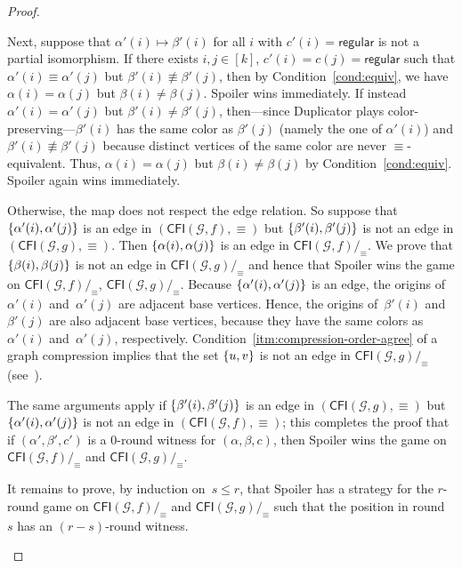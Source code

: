 \documentclass[10pt,a4paper]{article}
\DeclarePairedDelimiter\set{\lbrace}{\rbrace}
\newcommand{\regular}{\mathsf{regular}}
\newcommand{\comp}{\equiv}
\newcommand{\CFIsym}{\mathsf{CFI}}
\newcommand{\CFI}[1]{\CFIsym(#1)}
\newcommand{\compCFI}[2]{\CFI{#1}/_{#2}}
\newcommand{\precompCFI}[2]{{(\CFI{#1},#2)}}
\newcommand{\graphG}{\mathcal{G}}
\begin{document}
\begin{proof}
\begin{enumerate}
        Next, suppose that $\alpha'(i) \mapsto \beta'(i)$ for all $i$ with $c'(i) =\regular$
        is not a partial isomorphism. If there exists $i,j\in[k]$, $c'(i)=c(j)=\regular$ such that $\alpha'(i) \comp \alpha'(j)$ but $\beta'(i)\not\comp  \beta'(j)$, then
        by Condition~\ref{cond:equiv}, we have $\alpha(i)=\alpha(j)$ but $\beta(i)\neq \beta(j)$.
        Spoiler wins immediately.
        If instead $\alpha'(i) = \alpha'(j)$ but $\beta'(i) \neq \beta'(j)$,
        then---since Duplicator plays color-preserving---$\beta'(i)$ has the same color as $\beta'(j)$ (namely the one of $\alpha'(i)$)
        and $\beta'(i) \not\comp \beta'(j)$
        because distinct vertices of the same color are never $\comp$-\nobreakdash equivalent.
        Thus, $\alpha(i) = \alpha(j)$ but $\beta(i)\neq \beta(j)$ by Condition~\ref{cond:equiv}.
        Spoiler again wins immediately.
        
        Otherwise, the map does not respect the edge relation. So suppose that $\set{\alpha'(i),\alpha'(j)}$ is an edge in $\precompCFI{\graphG,f}{\comp}$
        but $\set{\beta'(i),\beta'(j)}$ is not an edge in $\precompCFI{\graphG,g}{\comp}$. Then $\set{\alpha(i),\alpha(j)}$ is an edge in $\compCFI{\graphG,f}{\comp}$.
        We prove that $\set{\beta(i),\beta(j)}$ is not an edge in $\compCFI{\graphG,g}{\comp}$ and hence that Spoiler wins the game on $\compCFI{\graphG,f}{\comp}$, $\compCFI{\graphG,g}{\comp}$.
        Because $\set{\alpha'(i),\alpha'(j)}$ is an edge,
        the origins of~$\alpha'(i)$ and~$\alpha'(j)$ are adjacent base vertices.
        Hence, the origins of~$\beta'(i)$ and~$\beta'(j)$ are also adjacent base vertices,
        because they have the same colors as~$\alpha'(i)$ and~$\alpha'(j)$, respectively.
       	Condition~\ref{itm:compression-order-agree} of a graph compression
       	implies that the set $\set{u,v}$ is not an edge in $\compCFI{\graphG,g}{\comp}$
       	(see~\cite[Lemma 11]{GroheLichterNeuenSchweitzer2023Arxiv}).
        
        The same arguments apply if $\set{\beta'(i),\beta'(j)}$ is an edge in $\precompCFI{\graphG,g}{\comp}$ but $\set{\alpha'(i),\alpha'(j)}$ is not an edge in $\precompCFI{\graphG,f}{\comp}$; this completes the proof that if $(\alpha', \beta', c')$ is a $0$\nobreakdash-round witness for $(\alpha,\beta,c)$, then Spoiler wins the game on $\compCFI{\graphG,f}{\comp}$ and $\compCFI{\graphG,g}{\comp}$. 
        
        It remains to prove, by induction on~$s\leq r$,
 that Spoiler has a strategy for the $r$\nobreakdash-round game on $\compCFI{\graphG,f}{\comp}$ and $\compCFI{\graphG,g}{\comp}$ such that the position in round~$s$ has an $(r-s)$\nobreakdash-round witness. 


\end{enumerate}
\end{proof}
\end{document}
